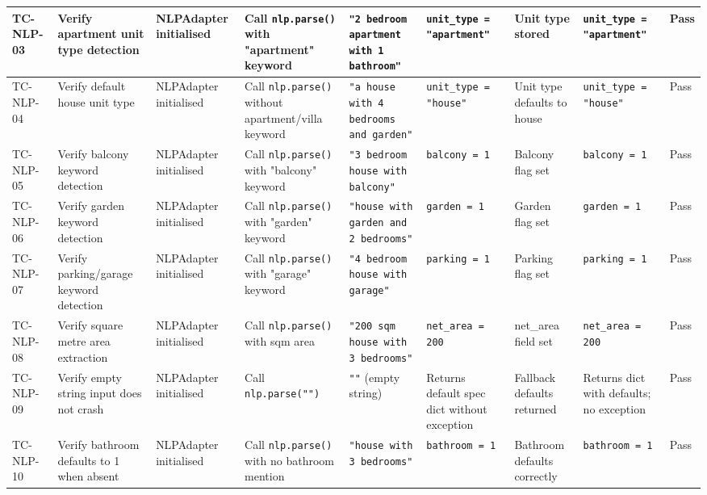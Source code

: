 \begin{landscape}
\begin{longtable}{|p{1.4cm}|p{3.2cm}|p{3.0cm}|p{2.8cm}|p{2.8cm}|p{2.8cm}|p{2.6cm}|p{2.8cm}|p{1.0cm}|}
\rowcolor{passgreen}
TC-NLP-03 & Verify apartment unit type detection & NLPAdapter initialised & Call \texttt{nlp.parse()} with "apartment" keyword & \texttt{"2 bedroom apartment with 1 bathroom"} & \texttt{unit\_type = "apartment"} & Unit type stored & \texttt{unit\_type = "apartment"} & Pass \\ \hline

\rowcolor{passgreen}
TC-NLP-04 & Verify default house unit type & NLPAdapter initialised & Call \texttt{nlp.parse()} without apartment/villa keyword & \texttt{"a house with 4 bedrooms and garden"} & \texttt{unit\_type = "house"} & Unit type defaults to house & \texttt{unit\_type = "house"} & Pass \\ \hline

\rowcolor{passgreen}
TC-NLP-05 & Verify balcony keyword detection & NLPAdapter initialised & Call \texttt{nlp.parse()} with "balcony" keyword & \texttt{"3 bedroom house with balcony"} & \texttt{balcony = 1} & Balcony flag set & \texttt{balcony = 1} & Pass \\ \hline

\rowcolor{passgreen}
TC-NLP-06 & Verify garden keyword detection & NLPAdapter initialised & Call \texttt{nlp.parse()} with "garden" keyword & \texttt{"house with garden and 2 bedrooms"} & \texttt{garden = 1} & Garden flag set & \texttt{garden = 1} & Pass \\ \hline

\rowcolor{passgreen}
TC-NLP-07 & Verify parking/garage keyword detection & NLPAdapter initialised & Call \texttt{nlp.parse()} with "garage" keyword & \texttt{"4 bedroom house with garage"} & \texttt{parking = 1} & Parking flag set & \texttt{parking = 1} & Pass \\ \hline

\rowcolor{passgreen}
TC-NLP-08 & Verify square metre area extraction & NLPAdapter initialised & Call \texttt{nlp.parse()} with sqm area & \texttt{"200 sqm house with 3 bedrooms"} & \texttt{net\_area = 200} & net\_area field set & \texttt{net\_area = 200} & Pass \\ \hline

\rowcolor{passgreen}
TC-NLP-09 & Verify empty string input does not crash & NLPAdapter initialised & Call \texttt{nlp.parse("")} & \texttt{""} (empty string) & Returns default spec dict without exception & Fallback defaults returned & Returns dict with defaults; no exception & Pass \\ \hline

\rowcolor{passgreen}
TC-NLP-10 & Verify bathroom defaults to 1 when absent & NLPAdapter initialised & Call \texttt{nlp.parse()} with no bathroom mention & \texttt{"house with 3 bedrooms"} & \texttt{bathroom = 1} & Bathroom defaults correctly & \texttt{bathroom = 1} & Pass \\ \hline


\end{longtable}
\end{landscape}
